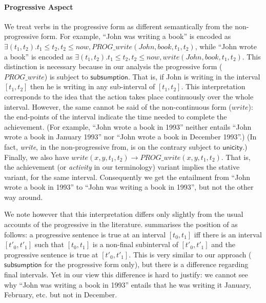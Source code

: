 \documentclass[11pt,a4paper]{article}
\newcommand\constant[1]{\mathsf{#1}}
\begin{document}
\paragraph{Progressive Aspect}

We treat verbs in the progressive form as different semantically from
the non-progressive form. For example, ``John was writing a book'' is
encoded as
$∃(t_1, t_2). t_1≤ t_2, t_2 ≤ now, PROG\_write(John,book,t_1,t_2)$,
while ``John wrote a book'' is encoded as
$∃(t_1, t_2). t_1≤ t_2, t_2 ≤ now, write(John,book,t_1,t_2)$. This distinction is
necessary because in our analysis the progressive form ($PROG\_write$) is subject to
$\constant{subsumption}$. That is, if John is writing in the interval
$[t_1,t_2]$ then he is writing in any sub-interval of
$[t_1,t_2]$. This interpretation corresponds to the idea that the action takes place continuously over the whole interval.
However, the same cannot be said of the non-continuous form ($write$): the
end-points of the interval indicate the time needed to complete the
achievement. (For example, ``John wrote a book in 1993'' neither
entails ``John wrote a book in January 1993'' nor ``John wrote a book
in December 1993''.) (In fact, \emph{write}, in the non-progressive
from, is on the contrary subject to $\constant{unicity}$.) Finally, we
also have $write(x,y,t_1,t_2) → PROG\_write(x,y,t_1,t_2)$. That is,
the achievement (or \emph{activity} in our terminology) variant implies the stative variant, for the
same interval.  Consequently we get the entailment from ``John wrote a
book in 1993'' to ``John was writing a book in 1993'', but not the other way around.

We note however that this interpretation differs only slightly from
the usual accounts of the progressive in the
literature.  summarises the position of
\citet{bennett1978toward} as follows: a progressive sentence is true
at an interval $[t_0,t_1]$ iff there is an interval $[t'_0,t'_1]$ such
that $[t_0,t_1]$ is a non-final subinterval of $[t'_0,t'_1]$ and the
progressive sentence is true at $[t'_0,t'_1]$. This is very similar to
our approach ($\constant{subsumption}$ for the progressive form only),
but there is a difference regarding final intervals. Yet in our view
this difference is hard to justify: we cannot see why ``John was
writing a book in 1993'' entails that he was writing it January,
February, etc. but not in December.
\end{document}
